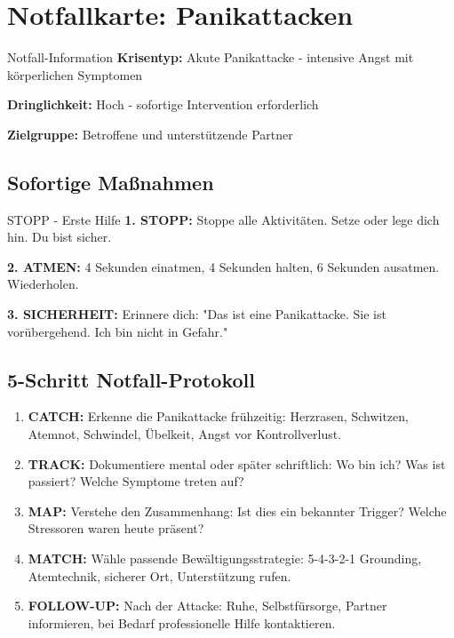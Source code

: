 % 

\section{Notfallkarte: Panikattacken}

\begin{ctmmRedBox}{\faExclamationTriangle\space Notfall-Information}
\textbf{Krisentyp:} Akute Panikattacke - intensive Angst mit körperlichen Symptomen

\textbf{Dringlichkeit:} Hoch - sofortige Intervention erforderlich

\textbf{Zielgruppe:} Betroffene und unterstützende Partner
\end{ctmmRedBox}

\subsection{Sofortige Maßnahmen}

\begin{ctmmYellowBox}{\faHandStopO\space STOPP - Erste Hilfe}
\textbf{1. STOPP:} Stoppe alle Aktivitäten. Setze oder lege dich hin. Du bist sicher.

\textbf{2. ATMEN:} 4 Sekunden einatmen, 4 Sekunden halten, 6 Sekunden ausatmen. Wiederholen.

\textbf{3. SICHERHEIT:} Erinnere dich: "Das ist eine Panikattacke. Sie ist vorübergehend. Ich bin nicht in Gefahr."
\end{ctmmYellowBox}

\subsection{5-Schritt Notfall-Protokoll}

\begin{enumerate}
\item \textbf{CATCH:} Erkenne die Panikattacke frühzeitig: Herzrasen, Schwitzen, Atemnot, Schwindel, Übelkeit, Angst vor Kontrollverlust.

\item \textbf{TRACK:} Dokumentiere mental oder später schriftlich: Wo bin ich? Was ist passiert? Welche Symptome treten auf?

\item \textbf{MAP:} Verstehe den Zusammenhang: Ist dies ein bekannter Trigger? Welche Stressoren waren heute präsent?

\item \textbf{MATCH:} Wähle passende Bewältigungsstrategie: 5-4-3-2-1 Grounding, Atemtechnik, sicherer Ort, Unterstützung rufen.

\item \textbf{FOLLOW-UP:} Nach der Attacke: Ruhe, Selbstfürsorge, Partner informieren, bei Bedarf professionelle Hilfe kontaktieren.
\end{enumerate}


